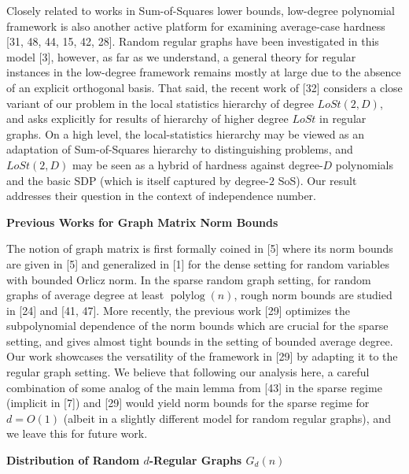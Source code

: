 Closely related to works in Sum-of-Squares lower bounds, low-degree polynomial framework is also another active platform for examining average-case hardness [31, 48, 44, 15, 42, 28]. Random regular graphs have been investigated in this model [3], however, as far as we understand, a general theory for regular instances in the low-degree framework remains mostly at large due to the absence of an explicit orthogonal basis. That said, the recent work of [32] considers a close variant of our problem in the local statistics hierarchy of degree $LoSt(2,D)$, and asks explicitly for results of hierarchy of higher degree $LoSt$ in regular graphs. On a high level, the local-statistics hierarchy may be viewed as an adaptation of Sum-of-Squares hierarchy to distinguishing problems, and $LoSt(2,D)$ may be seen as a hybrid of hardness against degree-$D$ polynomials and the basic SDP (which is itself captured by degree-$2$ SoS). Our result addresses their question in the context of independence number.\par





\par\medskip\noindent\textbf{Previous Works for Graph Matrix Norm Bounds}\par




The notion of graph matrix is first formally coined in [5] where its norm bounds are given in [5] and generalized in [1] for the dense setting for random variables with bounded Orlicz norm. In the sparse random graph setting, for random graphs of average degree at least $\operatorname{polylog}(n)$, rough norm bounds are studied in [24] and [41, 47]. More recently, the previous work [29] optimizes the subpolynomial dependence of the norm bounds which are crucial for the sparse setting, and gives almost tight bounds in the setting of bounded average degree. Our work showcases the versatility of the framework in [29] by adapting it to the regular graph setting. We believe that following our analysis here, a careful
combination of some analog of the main lemma from [43] in the sparse regime (implicit in [7]) and [29] would yield norm bounds for the sparse regime for $d=O(1)$ (albeit in a slightly different model for random regular graphs), and we leave this for future work.\par





\par\medskip\noindent\textbf{Distribution of Random $d$-Regular Graphs $G_{d}(n)$
}\par




